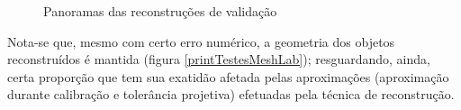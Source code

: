 		\begin{figure}[!htb]
			\centering
			\quad
			\quad
			\caption{Panoramas das reconstruções de validação}
			\label{printTestes}
		\end{figure}
		
		Nota-se que, mesmo com certo erro numérico, a geometria dos objetos reconstruídos é mantida (figura \ref{printTestesMeshLab}); resguardando, ainda, certa proporção que tem sua exatidão afetada pelas aproximações (aproximação durante calibração e tolerância projetiva) efetuadas pela técnica de reconstrução.
		
